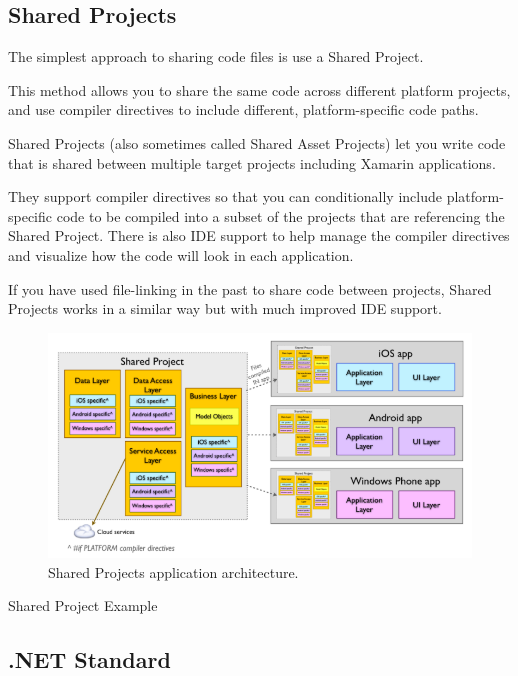 \subsection{Shared Projects}
The simplest approach to sharing code files is use a Shared Project.

This method allows you to share the same code across different platform projects, and use compiler directives to include different, platform-specific code paths.

Shared Projects (also sometimes called Shared Asset Projects) let you write code that is shared between multiple target projects including Xamarin applications.

They support compiler directives so that you can conditionally include platform-specific code to be compiled into a subset of the projects that are referencing the Shared Project. There is also IDE support to help manage the compiler directives and visualize how the code will look in each application.

If you have used file-linking in the past to share code between projects, Shared Projects works in a similar way but with much improved IDE support.

\begin{figure}[th]
\centering
\includegraphics[width=\textwidth] {Figures/SharedProjects}

\caption[Shared Projects architecture]{Shared Projects application architecture.}
\label{fig:SharedProjectsarchitecture}
\end{figure}

Shared Project Example


\subsection{.NET Standard}

